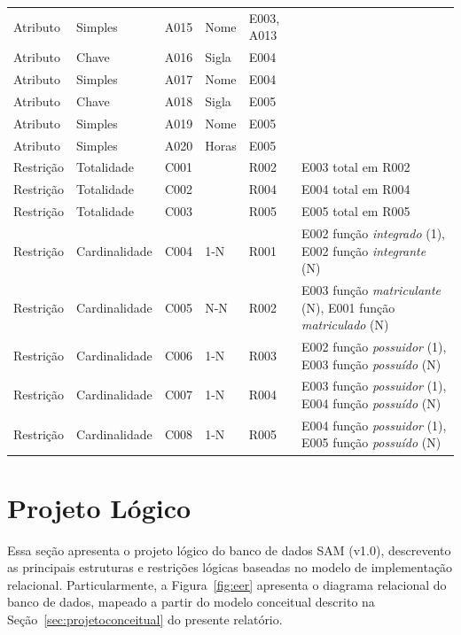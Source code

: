 \documentclass{article}
\begin{document}
\begin{table}[!htb]
\begin{tabularx}{\textwidth}{p{2.25cm} m{2.0cm} c p{2.5cm} m{1.75cm} m{4.75cm}}
		Atributo & Simples & A015 & Nome & E003, A013 & \\
		Atributo & Chave & A016 & Sigla & E004 & \\
		Atributo & Simples & A017 & Nome & E004 & \\
		Atributo & Chave & A018 & Sigla & E005 & \\
		Atributo & Simples & A019 & Nome & E005 & \\
		Atributo & Simples & A020 & Horas & E005 & \\
		Restri\c{c}\~ao & Totalidade & C001 & & R002 & E003 total em R002 \\
		Restri\c{c}\~ao & Totalidade & C002 & & R004 & E004 total em R004 \\
		Restri\c{c}\~ao & Totalidade & C003 & & R005 & E005 total em R005 \\
		Restri\c{c}\~ao & Cardinalidade & C004 & 1-N & R001 & E002 fun\c{c}\~ao \textit{integrado} (1), E002 fun\c{c}\~ao \textit{integrante} (N) \\
		Restri\c{c}\~ao & Cardinalidade & C005 & N-N & R002 & E003 fun\c{c}\~ao \textit{matriculante} (N), E001 fun\c{c}\~ao \textit{matriculado} (N) \\
		Restri\c{c}\~ao & Cardinalidade & C006 & 1-N & R003 & E002 fun\c{c}\~ao \textit{possuidor} (1), E003 fun\c{c}\~ao \textit{possu\'ido} (N) \\
		Restri\c{c}\~ao & Cardinalidade & C007 & 1-N & R004 & E003 fun\c{c}\~ao \textit{possuidor} (1), E004 fun\c{c}\~ao \textit{possu\'ido} (N) \\
		Restri\c{c}\~ao & Cardinalidade & C008 & 1-N & R005 & E004 fun\c{c}\~ao \textit{possuidor} (1), E005 fun\c{c}\~ao \textit{possu\'ido} (N) \\
		\bottomrule
	\end{tabularx}
    \label{tab:er}
\end{table}


\clearpage
\section{Projeto L\'ogico}
\label{sec:projetologico}
Essa se\c{c}\~ao apresenta o projeto l\'ogico do banco de dados SAM (v1.0), descrevento as principais estruturas e restri\c{c}\~oes l\'ogicas baseadas no modelo de implementa\c{c}\~ao relacional. Particularmente, a Figura~\ref{fig:eer} apresenta o diagrama relacional do banco de dados, mapeado a partir do modelo conceitual descrito na Se\c{c}\~ao~\ref{sec:projetoconceitual} do presente relat\'orio.
\end{document}
